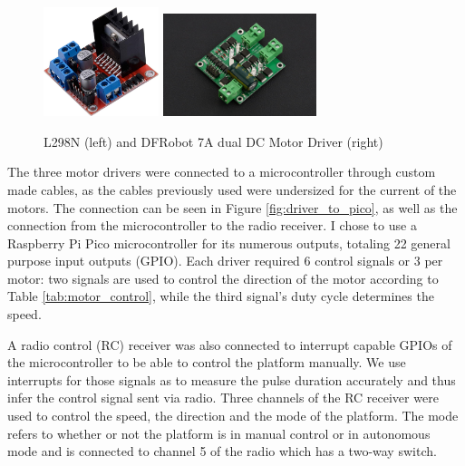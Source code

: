 \documentclass[12pt]{article}
\begin{document}
            
            \begin{figure}[h]
                \centering
                \includegraphics[width=0.3\textwidth]{Images/olddrivers.jpg}
                \includegraphics[width=0.4\textwidth]{Images/newdrivers.jpg}
                \caption{L298N (left) and DFRobot 7A dual DC Motor Driver (right)}
                \label{fig:drivers_comparison}
            \end{figure}

            The three motor drivers were connected to a microcontroller through custom made cables, as the cables previously used were undersized for the current of the motors. The connection can be seen in Figure \ref{fig:driver_to_pico}, as well as the connection from the microcontroller to the radio receiver.
            I chose to use a Raspberry Pi Pico microcontroller for its numerous outputs, totaling 22 general purpose input outputs (GPIO). Each driver required 6 control signals or 3 per motor: two signals are used to control the direction of the motor according to Table \ref{tab:motor_control}, while the third signal's duty cycle determines the speed.

            A radio control (RC) receiver was also connected to interrupt capable GPIOs of the microcontroller to be able to control the platform manually. We use interrupts for those signals as to measure the pulse duration accurately and thus infer the control signal sent via radio. Three channels of the RC receiver were used to control the speed, the direction and the mode of the platform. The mode refers to whether or not the platform is in manual control or in autonomous mode and is connected to channel 5 of the radio which has a two-way switch.
\end{document}
